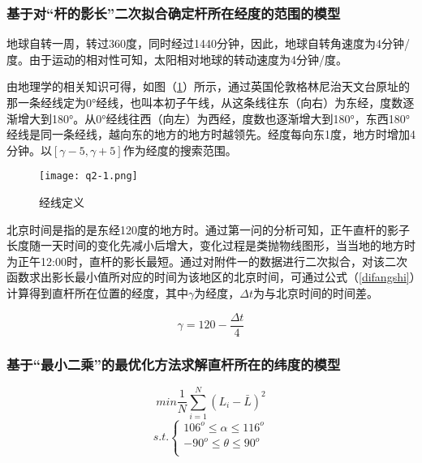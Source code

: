 \documentclass[withoutpreface,bwprint]{cumcmthesis} %
\begin{document}
\subsubsection{基于对“杆的影长”二次拟合确定杆所在经度的范围的模型}


\par 地球自转一周，转过360度，同时经过1440分钟，因此，地球自转角速度为4分钟/度。由于运动的相对性可知，太阳相对地球的转动速度为4分钟/度。

\par 由地理学的相关知识可得，如图（\ref{fig:q2-1}）所示，通过英国伦敦格林尼治天文台原址的那一条经线定为0°经线，也叫本初子午线，从这条线往东（向右）为东经，度数逐渐增大到180°。从0°经线往西（向左）为西经，度数也逐渐增大到180°，东西180°经线是同一条经线，越向东的地方的地方时越领先。经度每向东1度，地方时增加4分钟。以$[\gamma -5, \gamma +5]$作为经度的搜索范围。

\begin{figure}[h]
\small
\centering
\texttt{[image: q2-1.png]}
\caption{经线定义} \label{fig:q2-1}
\end{figure}


北京时间是指的是东经120度的地方时。通过第一问的分析可知，正午直杆的影子长度随一天时间的变化先减小后增大，变化过程是类抛物线图形，当当地的地方时为正午12:00时，直杆的影长最短。通过对附件一的数据进行二次拟合，对该二次函数求出影长最小值所对应的时间为该地区的北京时间，可通过公式（\ref{difangshi}）计算得到直杆所在位置的经度，其中$\gamma$为经度，$\Delta t$为与北京时间的时间差。
 
\begin{equation}
	\label{difangshi}
	\gamma = 120 -\frac{\Delta t}{4}
\end{equation}

\subsubsection{基于“最小二乘”的最优化方法求解直杆所在的纬度的模型}

\begin{equation}
	\label{q2-1-min}
	min \frac{1}{N} \sum\limits_{i=1}^{N}(L_i - \bar{L})^2
\end{equation}
\begin{equation}
\label{moxingerguihua}
s.t.\left\{  
  	\begin{array}{lr}
  	106^o \leqslant \alpha \leqslant 116^o\\
  	-90^o \leqslant \theta \leqslant 90^o\\  
	\end{array}  
\right.  
\end{equation}
\end{document}
